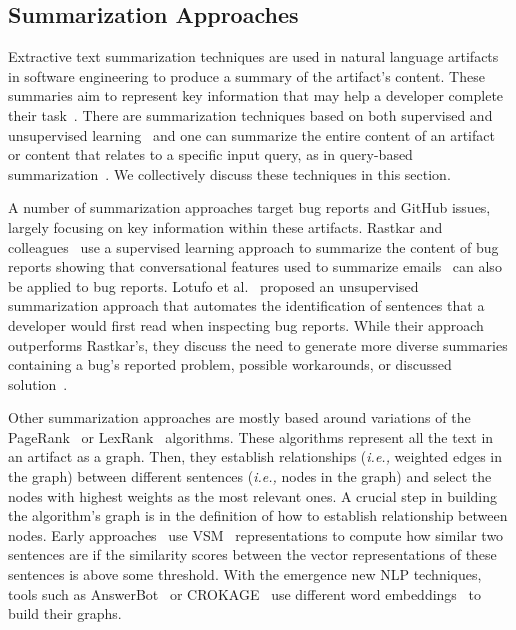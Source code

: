 \subsection{Summarization Approaches}



Extractive text summarization techniques are used in natural language artifacts in software engineering to
produce a summary of the artifact's content. These summaries aim to represent key information that may help a developer complete their task~\cite{Bavota2016}.
There are summarization techniques based on both supervised and unsupervised learning~\cite{moreno2017}
and one can summarize the entire content of an artifact
or content that relates to a specific input query, as in query-based summarization~\cite{Huang2018, Goldsteinet1999}.
We collectively discuss these techniques in this section. 






A number of summarization approaches target bug reports and GitHub issues, largely
focusing on key information within these artifacts. 
Rastkar and colleagues~\cite{Rastkar2010} use a supervised learning approach to summarize the content of bug reports showing that conversational features used to summarize emails~\cite{Murray2008}
can also be applied to bug reports.
Lotufo et al.~\cite{Lotufo2012} proposed an unsupervised summarization approach 
that automates the identification of sentences that a developer would first read when inspecting bug reports. While their approach outperforms Rastkar's, they discuss the need to generate more diverse summaries containing 
a bug's reported problem, possible workarounds, or discussed solution~\cite{Lotufo2012}.




Other summarization approaches are mostly based around variations of the PageRank~\cite{Page1999} or LexRank~\cite{Erkan2004} algorithms. 
These algorithms represent all the text in an artifact as a graph.
Then, they establish relationships (\textit{i.e.,} weighted edges in the graph) between different sentences (\textit{i.e.,} nodes in the graph) and select the nodes with highest weights as the most relevant ones.
A crucial step in building the algorithm's graph is in the definition of how to establish  relationship between nodes.
Early approaches~\cite{Lotufo2012, Jiang2017} 
use \ac{VSM}~\cite{Salton1975vsm} representations to compute how similar two sentences are
if the similarity scores between the vector representations of these sentences is above some threshold. 
With the emergence new \acs{NLP} techniques, 
tools such as AnswerBot~\cite{Huang2018} or {\small CROKAGE}~\cite{silva2019}
use different word embeddings~\cite{Mikolov2013, bojanowski2017FastText} to build their graphs.





